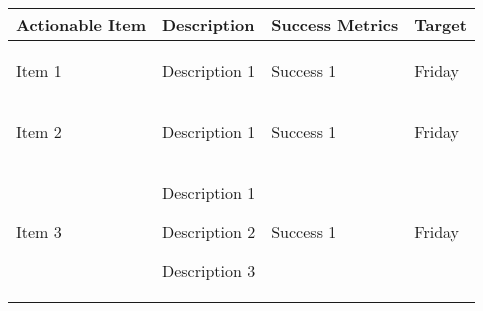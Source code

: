 \pagebreak
\begin{table}[!h]
    \centering
    \begin{tabularx}{\textwidth}{|X|X|X|l|}
        \hline
        Actionable Item & Description & Success Metrics & Target \\
        \hline
        \hline
        Item 1 &
        \begin{myitemize}
            \item Description 1
        \end{myitemize} &
        \begin{myitemize}
            \item Success 1
        \end{myitemize} &
        Friday \\
        \hline
        Item 2 &
        \begin{myitemize}
            \item Description 1
        \end{myitemize} &
        \begin{myitemize}
            \item Success 1
        \end{myitemize} &
        Friday \\
        \hline
        Item 3 &
        \begin{myitemize}
            \item Description 1
            \item Description 2
            \item Description 3
        \end{myitemize} &
        \begin{myitemize}
            \item Success 1
        \end{myitemize} &
        Friday \\
        \hline
    \end{tabularx}
\end{table}
